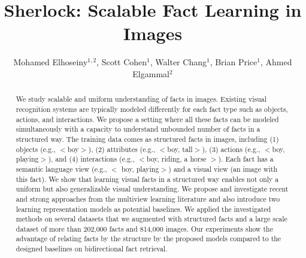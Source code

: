 \documentclass[runningheads]{llncs}
\begin{document}
\pagestyle{headings}
\mainmatter
\title{Sherlock: Scalable Fact Learning in Images} %


\author{ \small Mohamed Elhoseiny$^{1,2}$,  Scott Cohen$^{1}$,  Walter Chang$^{1}$,  Brian Price$^{1}$, Ahmed  Elgammal$^{2}$ \normalsize }




 \graphicspath{{./retrieval_qual3_seen_crop/}{./retrieval_qual3_unseen_crop/}{./KEx_qual2_crop/}{.//KEx_qual2_unseen_crop/}{./ret_qual3_gt5_seen_crop/}
 }




\maketitle




\begin{abstract}


We study scalable and uniform understanding of facts in images. Existing visual recognition systems are typically modeled differently for each fact type such as objects, actions, and interactions. We propose a setting where all these facts can be modeled simultaneously with a capacity to understand unbounded number of facts in a structured way.  The training data comes as structured facts in images,
including (1) objects (e.g.,  $<$boy$>$), (2)  attributes (e.g., $<$boy, tall$>$), (3) actions (e.g., $<$boy, playing$>$), and (4) interactions (e.g.,  $<$boy, riding, a horse $>$).  Each fact has a semantic language view (e.g., $<$ boy, playing$>$) and a visual view (an image with this fact). %
We show that learning visual facts in a structured way enables not only a uniform but also  generalizable visual understanding.  We propose and investigate recent and strong approaches from the multiview learning literature and also introduce two learning representation models as potential baselines. We applied the investigated methods on several datasets that we augmented with structured facts and a large scale dataset of more than 202,000 facts and 814,000 images. Our experiments show the advantage of relating facts by the structure by the proposed models compared to the designed baselines on bidirectional fact retrieval.


\end{abstract}
\end{document}
